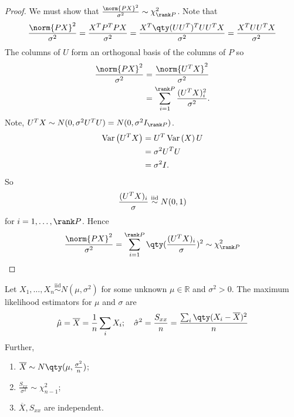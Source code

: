 \begin{proof}
	We must show that $\frac{\norm{PX}^2}{\sigma^2} \sim \chi^2_{\rank P}$.
	Note that
	\begin{align*}
		\frac{\norm{PX}^2}{\sigma^2} = \frac{X^\tran P^\tran P X}{\sigma^2} = \frac{X^\tran \qty(U U^\tran)^\tran U U^\tran X}{\sigma^2} = \frac{X^\tran U U^\tran X}{\sigma^2}
	\end{align*}
	The columns of $U$ form an orthogonal basis of the columns of $P$ so
	\begin{align*}
		\frac{\norm{PX}^2}{\sigma^2} &= \frac{\norm{U^\tran X}^2}{\sigma^2} \\
		&= \sum_{i = 1}^{\rank P} \frac{(U^\tran X)^2_i}{\sigma^2}.
	\end{align*} 
	Note, $U^\tran X \sim N(0,\sigma^2 U^\tran U) = N(0,\sigma^2 I_{\rank P})$.
	\begin{align*}
		\operatorname{Var}\left({U^T X}\right) &= U^T \operatorname{Var}\left({X}\right) U \\
		&= \sigma^2 U^T U \\
		&= \sigma^2 I. 
	\end{align*} 
	So
	\begin{align*}
		\frac{(U^T X)_i}{\sigma} \overset{\text{iid}}{\sim} N(0, 1)
	\end{align*}
	for $i = 1, \dots, \rank P$.
	Hence
	\begin{align*}
		\frac{\norm{PX}^2}{\sigma^2} = \sum_{i=1}^{\rank P} \qty(\frac{(U^\tran X)_i}{\sigma})^2 \sim \chi^2_{\rank P}
	\end{align*}
\end{proof}

\begin{theorem}
	Let $X_1, \dots, X_n \overset{\text{iid}}{\sim} N(\mu,\sigma^2)$ for some unknown $\mu \in \mathbb R$ and $\sigma^2 > 0$.
	The maximum likelihood estimators for $\mu$ and $\sigma$ are
	\begin{align*}
		\hat \mu = \overline X = \frac{1}{n} \sum_i X_i;\quad \hat \sigma^2 = \frac{S_{xx}}{n} = \frac{\sum_i \qty(X_i - \overline X)^2}{n}
	\end{align*}
	Further,
	\begin{enumerate}
		\item $\overline X \sim N\qty(\mu, \frac{\sigma^2}{n})$;
		\item $\frac{S_{xx}}{\sigma^2} \sim \chi^2_{n-1}$;
		\item $\overline X, S_{xx}$ are independent.
	\end{enumerate}
\end{theorem}

